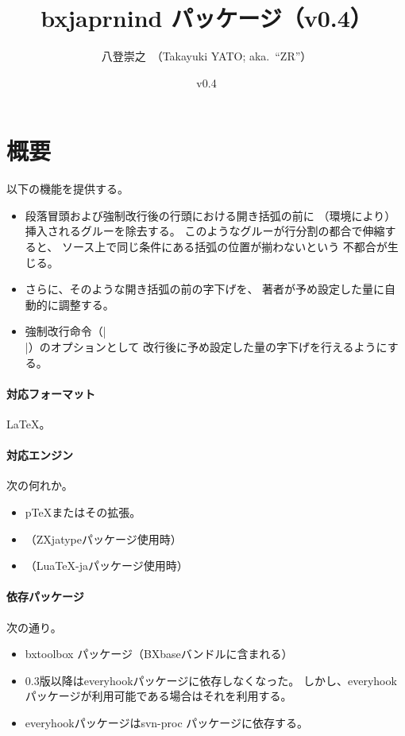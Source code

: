 \documentclass[a4paper]{ltjsarticle}
\newcommand{\PkgVersion}{0.4}
\newcommand{\PkgDate}{2021/06/06}
\newcommand{\Pkg}[1]{\textsf{#1}}
\providecommand{\pTeX}{p\TeX}
\begin{document}
\title{\Pkg{bxjaprnind} パッケージ（v\PkgVersion）}
\author{八登崇之\ （Takayuki YATO; aka.~``ZR''）}
\date{v\PkgVersion\quad[\PkgDate]}
\maketitle

\section{概要}
\label{sec:Overview}

以下の機能を提供する。
\begin{itemize}
\item 段落冒頭および強制改行後の行頭における開き括弧の前に
  （環境により）挿入されるグルーを除去する。
  このようなグルーが行分割の都合で伸縮すると、
  ソース上で同じ条件にある括弧の位置が揃わないという
  不都合が生じる。
\item さらに、そのような開き括弧の前の字下げを、
  著者が予め設定した量に自動的に調整する。
\item 強制改行命令（|\\|）のオプションとして
  改行後に予め設定した量の字下げを行えるようにする。
\end{itemize}

\paragraph{対応フォーマット} \LaTeX。

\paragraph{対応エンジン} 次の何れか。
\begin{itemize}
\item {\pTeX}またはその拡張。
\item {\XeTeX}（\Pkg{ZXjatype}パッケージ使用時）
\item {\LuaTeX}（\Pkg{LuaTeX-ja}パッケージ使用時）
\end{itemize}

\paragraph{依存パッケージ} 次の通り。
\begin{itemize}
\item \Pkg{bxtoolbox} パッケージ（\Pkg{BXbase}バンドルに含まれる）
\item 0.3版以降は\Pkg{everyhook}パッケージに依存しなくなった。
しかし、\Pkg{everyhook}パッケージが利用可能である場合はそれを利用する。
\item \Pkg{everyhook}パッケージは\Pkg{svn-proc} パッケージに依存する。
\end{itemize}
\end{document}
